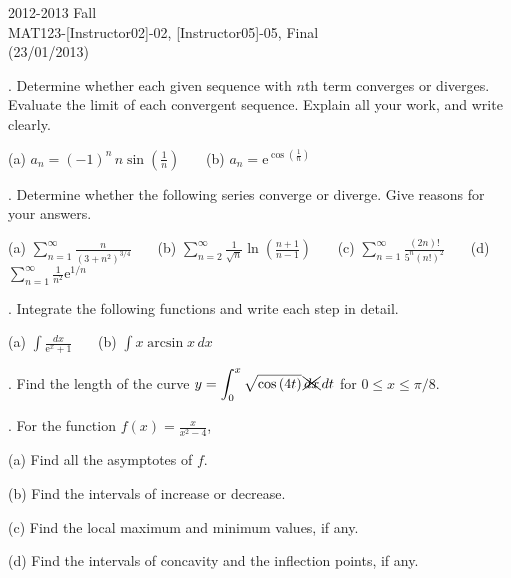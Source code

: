 \documentclass{article}
\begin{document}
\pagestyle{empty}
\large

\begin{center}
2012-2013 Fall \\MAT123-[Instructor02]-02, [Instructor05]-05, Final\\(23/01/2013)
\end{center}

. Determine whether each given sequence with $n$th term converges or diverges. Evaluate the limit of each convergent sequence. Explain all your work, and write clearly.

\hfill

(a) $\displaystyle a_n=(-1)^n\,n\sin\left(\frac1n\right)$ \ \ \ (b) $\displaystyle a_n=\mathrm{e}^{\cos\left(\textstyle\frac1n\right)}$

\hfill

. Determine whether the following series converge or diverge. Give reasons for your answers.

\hfill

(a) $\displaystyle\sum_{n=1}^\infty\frac n{\left(3+n^2\right)^{3/4}}$ \ \ \ (b) $\displaystyle\sum_{n=2}^\infty\frac1{\sqrt n}\ln\left(\frac{n+1}{n-1}\right)$ \ \ \ (c) $\displaystyle\sum_{n=1}^\infty\frac{(2n)!}{5^n\left(n!\right)^2}$ \ \ \ (d) $\displaystyle\sum_{n=1}^\infty\frac1{n^2}\mathrm{e}^{1/n}$

\hfill

. Integrate the following functions and write each step in detail.

\hfill

(a) $\displaystyle\int\frac{dx}{\mathrm{e}^x+1}$ \ \ \ (b) $\displaystyle\int x\arcsin x\,dx$

\hfill

. Find the length of the curve $\displaystyle y=\int_0^x\sqrt{\cos\left(4t\right)}\,\xcancel{dx}\,dt$ for $0\leq x\leq \pi/8$.

\hfill

. For the function $\displaystyle f(x)=\frac x{x^2-4}$,

\hfill

(a) Find all the asymptotes of $f$.

\hfill

(b) Find the intervals of increase or decrease.

\hfill

(c) Find the local maximum and minimum values, if any.

\hfill

(d) Find the intervals of concavity and the inflection points, if any.
\end{document}
